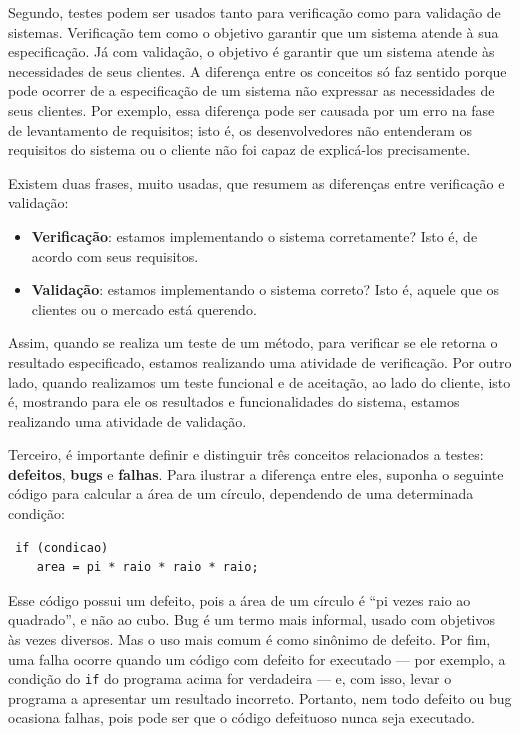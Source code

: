 \documentclass[
  11pt,
  twoside]{book}
\newcommand{\passthrough}[1]{#1}
\begin{document}
Segundo, testes podem ser usados tanto para verificação como para
validação de sistemas. Verificação tem como o objetivo garantir que um
sistema atende à sua especificação. Já com validação, o objetivo é
garantir que um sistema atende às necessidades de seus clientes. A
diferença entre os conceitos só faz sentido porque pode ocorrer de a
especificação de um sistema não expressar as necessidades de seus
clientes. Por exemplo, essa diferença pode ser causada por um erro na
fase de levantamento de requisitos; isto é, os desenvolvedores não
entenderam os requisitos do sistema ou o cliente não foi capaz de
explicá-los precisamente.

Existem duas frases, muito usadas, que resumem as diferenças entre
verificação e validação:

\begin{itemize}
\item
  \textbf{Verificação}: estamos implementando o sistema corretamente?
  Isto é, de acordo com seus requisitos.
\item
  \textbf{Validação}: estamos implementando o sistema correto? Isto é,
  aquele que os clientes ou o mercado está querendo.
\end{itemize}

Assim, quando se realiza um teste de um método, para verificar se ele
retorna o resultado especificado, estamos realizando uma atividade de
verificação. Por outro lado, quando realizamos um teste funcional e de
aceitação, ao lado do cliente, isto é, mostrando para ele os resultados
e funcionalidades do sistema, estamos realizando uma atividade de
validação.

   Terceiro, é importante
definir e distinguir três conceitos relacionados a testes:
\textbf{defeitos}, \textbf{bugs} e \textbf{falhas}. Para ilustrar a
diferença entre eles, suponha o seguinte código para calcular a área de
um círculo, dependendo de uma determinada condição:

\begin{lstlisting}
 if (condicao)
    area = pi * raio * raio * raio; 
\end{lstlisting}

Esse código possui um defeito, pois a área de um círculo é ``pi vezes
raio ao quadrado'', e não ao cubo. Bug é um termo mais informal, usado
com objetivos às vezes diversos. Mas o uso mais comum é como sinônimo de
defeito. Por fim, uma falha ocorre quando um código com defeito for
executado --- por exemplo, a condição do \passthrough{\lstinline!if!} do
programa acima for verdadeira --- e, com isso, levar o programa a
apresentar um resultado incorreto. Portanto, nem todo defeito ou bug
ocasiona falhas, pois pode ser que o código defeituoso nunca seja
executado.
\end{document}

